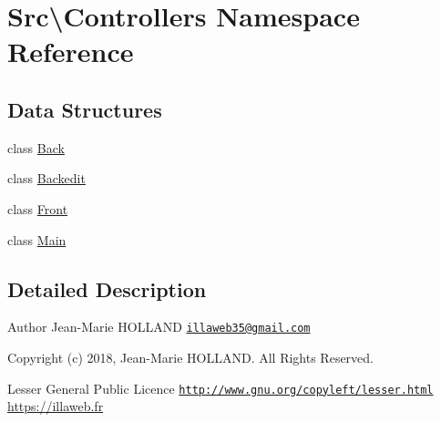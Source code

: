 \hypertarget{namespace_src_1_1_controllers}{}\section{Src\textbackslash{}Controllers Namespace Reference}
\label{namespace_src_1_1_controllers}
\subsection*{Data Structures}
\begin{DoxyCompactItemize}
\item 
class \hyperlink{class_src_1_1_controllers_1_1_back}{Back}
\item 
class \hyperlink{class_src_1_1_controllers_1_1_backedit}{Backedit}
\item 
class \hyperlink{class_src_1_1_controllers_1_1_front}{Front}
\item 
class \hyperlink{class_src_1_1_controllers_1_1_main}{Main}
\end{DoxyCompactItemize}


\subsection{Detailed Description}
\begin{DoxyAuthor}{Author}
Jean-\/\+Marie H\+O\+L\+L\+A\+ND \href{mailto:illaweb35@gmail.com}{\tt illaweb35@gmail.\+com} 
\end{DoxyAuthor}
\begin{DoxyCopyright}{Copyright}
(c) 2018, Jean-\/\+Marie H\+O\+L\+L\+A\+ND. All Rights Reserved.
\end{DoxyCopyright}
Lesser General Public Licence \href{http://www.gnu.org/copyleft/lesser.html}{\tt http\+://www.\+gnu.\+org/copyleft/lesser.\+html} \hyperlink{}{https\+://illaweb.\+fr}